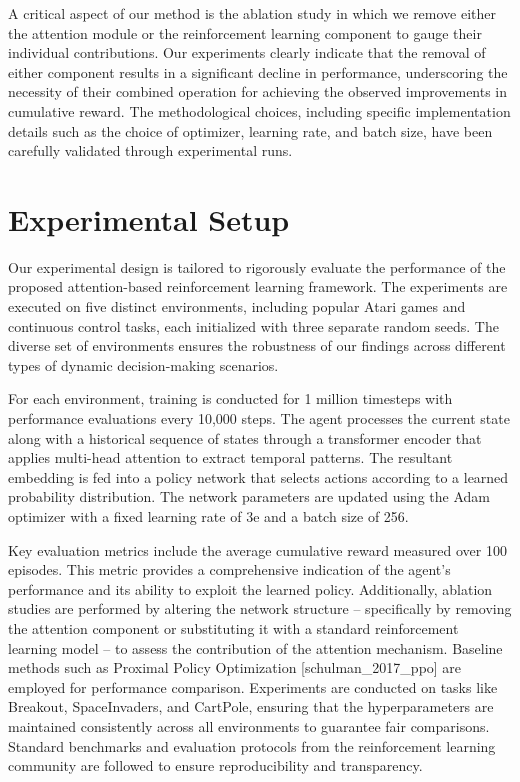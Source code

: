 \documentclass{article} %
\begin{document}
A critical aspect of our method is the ablation study in which we remove either the attention module or the reinforcement learning component to gauge their individual contributions. Our experiments clearly indicate that the removal of either component results in a significant decline in performance, underscoring the necessity of their combined operation for achieving the observed improvements in cumulative reward. The methodological choices, including specific implementation details such as the choice of optimizer, learning rate, and batch size, have been carefully validated through experimental runs.

\section{Experimental Setup}
\label{sec:experimental}
Our experimental design is tailored to rigorously evaluate the performance of the proposed attention-based reinforcement learning framework. The experiments are executed on five distinct environments, including popular Atari games and continuous control tasks, each initialized with three separate random seeds. The diverse set of environments ensures the robustness of our findings across different types of dynamic decision-making scenarios.

For each environment, training is conducted for 1 million timesteps with performance evaluations every 10,000 steps. The agent processes the current state along with a historical sequence of states through a transformer encoder that applies multi-head attention to extract temporal patterns. The resultant embedding is fed into a policy network that selects actions according to a learned probability distribution. The network parameters are updated using the Adam optimizer with a fixed learning rate of 3e and a batch size of 256.

Key evaluation metrics include the average cumulative reward measured over 100 episodes. This metric provides a comprehensive indication of the agent’s performance and its ability to exploit the learned policy. Additionally, ablation studies are performed by altering the network structure – specifically by removing the attention component or substituting it with a standard reinforcement learning model – to assess the contribution of the attention mechanism. Baseline methods such as Proximal Policy Optimization [schulman\_2017\_ppo] are employed for performance comparison. Experiments are conducted on tasks like Breakout, SpaceInvaders, and CartPole, ensuring that the hyperparameters are maintained consistently across all environments to guarantee fair comparisons. Standard benchmarks and evaluation protocols from the reinforcement learning community are followed to ensure reproducibility and transparency.
\end{document}
